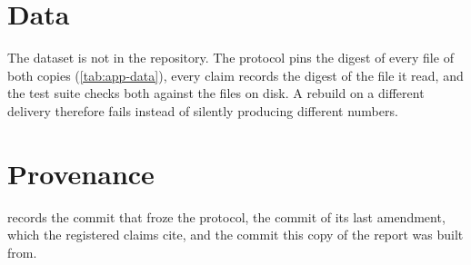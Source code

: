 

\section{Data}

The dataset is not in the repository. The protocol pins the digest of every file of both copies
(\cref{tab:app-data}), every claim records the digest of the file it read, and the test suite checks both against the files on disk.
A rebuild on a different delivery therefore fails instead of silently producing different numbers.



\section{Provenance}

 records the commit that froze the protocol, the commit of its last amendment, which the
registered claims cite, and the commit this copy of the report was built from.


